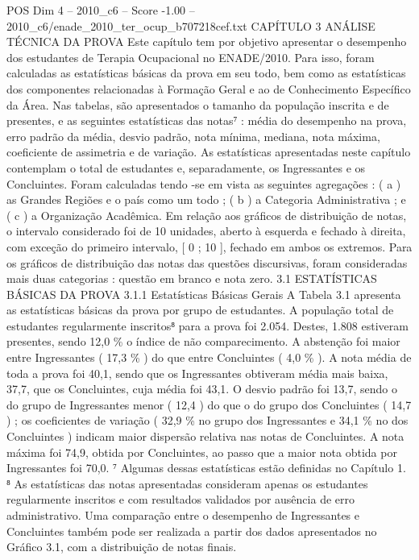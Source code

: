 \begin{textsample}{POS Dim 4 – 2010\_c6 – Score -1.00 – 2010\_c6/enade\_2010\_ter\_ocup\_b707218cef.txt}  \label{ex:f4_pos_310}
CAPÍTULO 3 ANÁLISE TÉCNICA DA PROVA Este capítulo tem por objetivo apresentar o desempenho dos estudantes de Terapia Ocupacional no ENADE/2010.
Para isso, foram calculadas as estatísticas básicas da prova em seu todo, bem como as estatísticas dos componentes relacionadas à Formação Geral e ao de Conhecimento Específico da Área.
Nas tabelas, são apresentados o tamanho da população inscrita e de presentes, e as seguintes estatísticas das notas⁷ : média do desempenho na prova, erro padrão da média, desvio padrão, nota mínima, mediana, nota máxima, coeficiente de assimetria e de variação.
As estatísticas apresentadas neste capítulo contemplam o total de estudantes e, separadamente, os Ingressantes e os Concluintes.
Foram calculadas tendo -se em vista as seguintes agregações : ( a ) as Grandes Regiões e o país como um todo ; ( b ) a Categoria Administrativa ; e ( c ) a Organização Acadêmica.
Em relação aos gráficos de distribuição de notas, o intervalo considerado foi de 10 unidades, aberto à esquerda e fechado à direita, com exceção do primeiro intervalo, [ 0 ; 10 ], fechado em ambos os extremos.
Para os gráficos de distribuição das notas das questões discursivas, foram consideradas mais duas categorias : questão em branco e nota zero. 3.1 ESTATÍSTICAS BÁSICAS DA PROVA 3.1.1 Estatísticas Básicas Gerais A Tabela 3.1 apresenta as estatísticas básicas da prova por grupo de estudantes.
A população total de estudantes regularmente inscritos⁸ para a prova foi 2.054.
Destes, 1.808 estiveram presentes, sendo 12,0 \% o índice de não comparecimento.
A abstenção foi maior entre Ingressantes ( 17,3 \% ) do que entre Concluintes ( 4,0 \% ).
A nota média de toda a prova foi 40,1, sendo que os Ingressantes obtiveram média mais baixa, 37,7, que os Concluintes, cuja média foi 43,1.
O desvio padrão foi 13,7, sendo o do grupo de Ingressantes menor ( 12,4 ) do que o do grupo dos Concluintes ( 14,7 ) ; os coeficientes de variação ( 32,9 \% no grupo dos Ingressantes e 34,1 \% no dos Concluintes ) indicam maior dispersão relativa nas notas de Concluintes.
A nota máxima foi 74,9, obtida por Concluintes, ao passo que a maior nota obtida por Ingressantes foi 70,0. ⁷ Algumas dessas estatísticas estão definidas no Capítulo 1. ⁸ As estatísticas das notas apresentadas consideram apenas os estudantes regularmente inscritos e com resultados validados por ausência de erro administrativo.
Uma comparação entre o desempenho de Ingressantes e Concluintes também pode ser realizada a partir dos dados apresentados no Gráfico 3.1, com a distribuição de notas finais.

\end{textsample}
